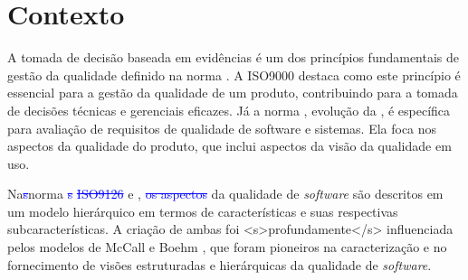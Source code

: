 \section{Contexto}\label{contextualizacao}



A tomada de decisão baseada em evidências é um dos princípios fundamentais de gestão da qualidade definido na norma . A ISO9000 destaca como este princípio é essencial para a gestão da qualidade de um produto, contribuindo para a tomada de decisões técnicas e gerenciais eficazes. Já a norma , evolução da , é específica para avaliação de requisitos de qualidade de software e sistemas. Ela foca nos aspectos da qualidade do produto, que inclui aspectos da visão da qualidade em uso. 

Na\textcolor{blue}{\st{s}}norma \textcolor{blue}{\st{s}} \textcolor{blue}{\st{ISO9126}} e ,  \textcolor{blue}{\st{os aspectos}}  da qualidade de \textit{software} são descritos em um modelo hierárquico em termos de características e suas respectivas subcaracterísticas. A criação de ambas foi <s>profundamente</s> influenciada pelos modelos de McCall \cite{mccall1977factors} e Boehm \cite{boehm1978characteristics}, que foram pioneiros na caracterização e no fornecimento de visões estruturadas e hierárquicas da qualidade de \textit{software}.




